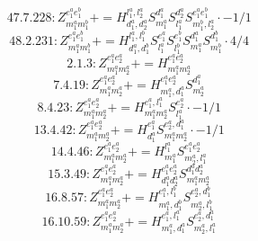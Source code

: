 \documentclass[letterpaper,10pt,fleqn,leqno,onecolumn]{article}
\begin{document}
\begin{equation} \;\;\;\;\;\;  47.7.228: Z^{e_{1}^{a}e_{1}^{b}}_{m_{1}^{a}m_{1}^{b}}+=H^{l_{1}^{a},l_{2}^{a}}_{d_{1}^{a},d_{2}^{a}}S^{d_{1}^{a}}_{m_{1}^{a}}S^{d_{2}^{a}}_{l_{1}^{a}}S^{e_{1}^{a}e_{1}^{b}}_{m_{1}^{b},l_{2}^{a}}\cdot -1/1 \end{equation}
\begin{equation} \;\;\;\;\;\;  48.2.231: Z^{e_{1}^{a}e_{1}^{b}}_{m_{1}^{a}m_{1}^{b}}+=H^{l_{1}^{a},l_{1}^{b}}_{d_{1}^{a},d_{1}^{b}}S^{e_{1}^{a}}_{l_{1}^{a}}S^{e_{1}^{b}}_{l_{1}^{b}}S^{d_{1}^{a}}_{m_{1}^{a}}S^{d_{1}^{b}}_{m_{1}^{b}}\cdot 4/4 \end{equation}
\begin{equation} \;\;\;\;\;\;  2.1.3: Z^{e_{1}^{a}e_{2}^{a}}_{m_{1}^{a}m_{2}^{a}}+=H^{e_{1}^{a}e_{2}^{a}}_{m_{1}^{a}m_{2}^{a}} \end{equation}
\begin{equation} \;\;\;\;\;\;  7.4.19: Z^{e_{1}^{a}e_{2}^{a}}_{m_{1}^{a}m_{2}^{a}}+=H^{e_{1}^{a}e_{2}^{a}}_{m_{1}^{a},d_{1}^{a}}S^{d_{1}^{a}}_{m_{2}^{a}} \end{equation}
\begin{equation} \;\;\;\;\;\;  8.4.23: Z^{e_{1}^{a}e_{2}^{a}}_{m_{1}^{a}m_{2}^{a}}+=H^{e_{1}^{a},l_{1}^{a}}_{m_{1}^{a}m_{2}^{a}}S^{e_{2}^{a}}_{l_{1}^{a}}\cdot -1/1 \end{equation}
\begin{equation} \;\;\;\;\;\;  13.4.42: Z^{e_{1}^{a}e_{2}^{a}}_{m_{1}^{a}m_{2}^{a}}+=H^{e_{1}^{a}}_{d_{1}^{a}}S^{e_{2}^{a},d_{1}^{a}}_{m_{1}^{a}m_{2}^{a}}\cdot -1/1 \end{equation}
\begin{equation} \;\;\;\;\;\;  14.4.46: Z^{e_{1}^{a}e_{2}^{a}}_{m_{1}^{a}m_{2}^{a}}+=H^{l_{1}^{a}}_{m_{1}^{a}}S^{e_{1}^{a}e_{2}^{a}}_{m_{2}^{a},l_{1}^{a}} \end{equation}
\begin{equation} \;\;\;\;\;\;  15.3.49: Z^{e_{1}^{a}e_{2}^{a}}_{m_{1}^{a}m_{2}^{a}}+=H^{e_{1}^{a}e_{2}^{a}}_{d_{1}^{a}d_{2}^{a}}S^{d_{1}^{a}d_{2}^{a}}_{m_{1}^{a}m_{2}^{a}} \end{equation}
\begin{equation} \;\;\;\;\;\;  16.8.57: Z^{e_{1}^{a}e_{2}^{a}}_{m_{1}^{a}m_{2}^{a}}+=H^{e_{1}^{a},l_{1}^{b}}_{m_{1}^{a},d_{1}^{b}}S^{e_{2}^{a},d_{1}^{b}}_{m_{2}^{a},l_{1}^{b}} \end{equation}
\begin{equation} \;\;\;\;\;\;  16.10.59: Z^{e_{1}^{a}e_{2}^{a}}_{m_{1}^{a}m_{2}^{a}}+=H^{e_{1}^{a},l_{1}^{a}}_{m_{1}^{a},d_{1}^{a}}S^{e_{2}^{a},d_{1}^{a}}_{m_{2}^{a},l_{1}^{a}} \end{equation}
\end{document}

